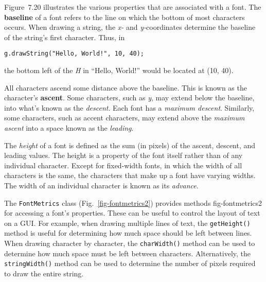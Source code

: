 Figure~7.20 illustrates the various properties that
are associated with a font.   The {\bf baseline} of a font refers to
the line on which the bottom of most characters occurs.  When drawing a
string, the {\it x-} and {\it y-}coordinates determine the baseline of
the string's first character.  Thus, in

\begin{jjjlisting}
\begin{lstlisting}
g.drawString("Hello, World!", 10, 40);
\end{lstlisting}
\end{jjjlisting}

\noindent the bottom left of the {\it H} in ``Hello, World!'' would be
located at (10, 40).

All characters ascend some distance above the baseline.  This is known
as the character's {\bf ascent}.  Some characters, such as {\it y},
may extend below the baseline, into what's known as the {\it
descent}. Each font has a {\it maximum descent}.  Similarly, some
characters, such as accent characters, may extend above the {\it
maximum ascent} into a space known as the {\it leading}.

The {\it height} of a font is defined as the sum (in pixels) of the
ascent, descent, and leading values.  The height is a property of the
font itself rather than of any individual character.   Except for
fixed-width fonts, in which the width of all characters is the same,
the characters that make up a font have varying widths.  The width of
an individual character is known as its {\it advance}.



The {\tt FontMetrics} class (Fig.~\ref{fig-fontmetrics2}) provides methods
{fig-fontmetrics2}
for accessing a font's properties.  These can be useful to control the
layout of text on a GUI.  For example, when drawing multiple lines of
text, the {\tt getHeight()} method is useful for determining how much
space should be left between lines.  When drawing character by
character, the {\tt charWidth()} method can be used to determine how
much space must be left between characters.  Alternatively, the {\tt
stringWidth()} method can be used to determine the number of pixels
required to draw the entire string.

